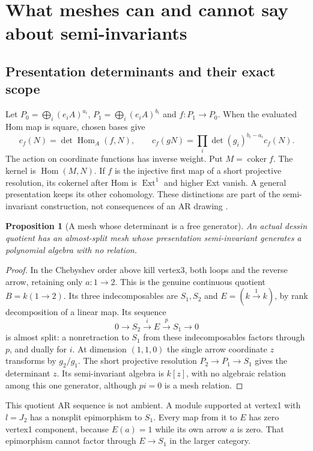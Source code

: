\documentclass[11pt,oneside,openany]{book}
\newtheorem{proposition}[theorem]{Proposition}
\theoremstyle{definition}\newtheorem{definition}[theorem]{Definition}
\theoremstyle{remark}\newtheorem{remark}[theorem]{Remark}
\begin{document}
\section[Meshes and semi-invariants]{What meshes can and cannot say about semi-invariants}
\subsection{Presentation determinants and their exact scope}
Let $P_0=\bigoplus_i(e_iA)^{a_i}$, $P_1=\bigoplus_i(e_iA)^{b_i}$ and
$f:P_1\to P_0$. When the evaluated Hom map is square, chosen bases give
\[
 c_f(N)=\det\operatorname{Hom}_A(f,N),\qquad
 c_f(gN)=\prod_i\det(g_i)^{b_i-a_i}c_f(N).
\]
The action on coordinate functions has inverse weight. Put $M=\operatorname{coker}f$.
The kernel is $\operatorname{Hom}(M,N)$. If $f$ is the injective first map of a
short projective resolution, its cokernel after Hom
is $\operatorname{Ext}^1$ and higher Ext vanish. A general presentation keeps
its other cohomology. These distinctions are part of the semi-invariant
construction, not consequences of an AR drawing \cite{ARBSchofield}.

\begin{proposition}[A mesh whose determinant is a free generator]
\label{arb:freegenerator}
An actual dessin quotient has an almost-split mesh whose presentation
semi-invariant generates a polynomial algebra with no relation.
\end{proposition}
\begin{proof}
In the Chebyshev order above kill vertex3, both loops and the reverse arrow,
retaining only $a:1\to2$. This is the genuine continuous quotient
$B=k(1\to2)$. Its three indecomposables are $S_1,S_2$ and
$E=(k\xrightarrow1k)$, by rank decomposition of a linear map. Its sequence
\[
 0\to S_2\xrightarrow{i}E\xrightarrow{p}S_1\to0
\]
is almost split: a nonretraction to $S_1$ from these indecomposables factors
through $p$, and dually for $i$. At dimension $(1,1,0)$ the single arrow
coordinate $z$ transforms by $g_2/g_1$. The short projective resolution
$P_2\to P_1\to S_1$ gives the determinant $z$. Its semi-invariant algebra
is $k[z]$, with no algebraic relation among this one generator, although
$p i=0$ is a mesh relation.
\end{proof}
This quotient AR sequence is not ambient. A module supported at vertex1
with $l=J_2$ has a nonsplit epimorphism to $S_1$. Every map from it to $E$
has zero vertex1 component, because $E(a)=1$ while its own arrow $a$ is zero.
That epimorphism cannot factor through $E\to S_1$ in the larger category.
\end{document}
